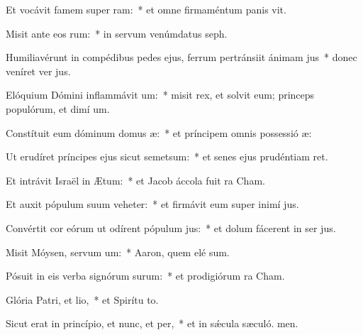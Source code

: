 \item Et vocávit famem super ram:~* et omne firmaméntum panis vit.
\item Misit ante eos rum:~* in servum venúmdatus  seph.
\item Humiliavérunt in compédibus pedes ejus, ferrum pertránsiit ánimam jus~* donec veníret ver jus.
\item Elóquium Dómini inflammávit um:~* misit rex, et solvit eum; princeps populórum, et dimí um.
\item Constítuit eum dóminum domus æ:~* et príncipem omnis possessió æ:
\item Ut erudíret príncipes ejus sicut semetsum:~* et senes ejus prudéntiam ret.
\item Et intrávit Israël in Ætum:~* et Jacob áccola fuit  ra Cham.
\item Et auxit pópulum suum veheter:~* et firmávit eum super inimí jus.
\item Convértit cor eórum ut odírent pópulum jus:~* et dolum fácerent in ser jus.
\item Misit Móysen, servum um:~* Aaron, quem elé sum.
\item Pósuit in eis verba signórum surum:~* et prodigiórum  ra Cham.
\item Glória Patri, et lio,~* et Spirítu to.
\item Sicut erat in princípio, et nunc, et per,~* et in sǽcula sæculó. men.
